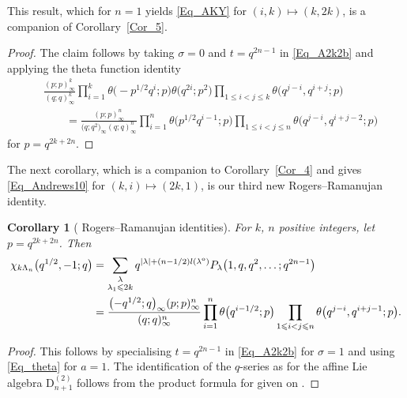 \documentclass[pdftex]{sigma}
\numberwithin{equation}{section}
\newtheorem{Corollary}[Theorem]{Corollary}
\renewcommand{\leq}{\leqslant}
\newcommand{\abs}[1]{\vert#1\vert}
\newcommand{\la}{\lambda}
\newcommand{\La}{\Lambda}
\begin{document}
This result, which for $n=1$ yields \eqref{Eq_AKY} for
$(i,k)\mapsto(k,2k)$, is a companion of Corollary~\ref{Cor_5}.

\begin{proof}
The claim follows by taking $\sigma=0$ and $t=q^{2n-1}$ in
\eqref{Eq_A2k2b} and applying the theta function identity
\begin{align*}
&\frac{(p;p)_{\infty}^k}{(q;q)_{\infty}^k}
\prod_{i=1}^k \theta\bigl({-}p^{1/2}q^i;p\bigr)
\theta\bigl(q^{2i};p^2\bigr)
\prod_{1\leq i<j\leq k}\theta\bigl(q^{j-i},q^{i+j};p\bigr) \\
&\qquad= \frac{(p;p)_{\infty}^n}{\bigl(q;q^2\bigr)_{\infty}(q;q)_{\infty}^n}
\prod_{i=1}^n \theta\bigl(p^{1/2}q^{i-1};p\bigr)
\prod_{1\leq i<j\leq n} \theta\bigl(q^{j-i},q^{i+j-2};p\bigr)
\end{align*}
for $p=q^{2k+2n}$.
\end{proof}

The next corollary, which is a companion to Corollary~\ref{Cor_4} and
gives \eqref{Eq_Andrews10} for $(k,i)\mapsto (2k,1)$, is our third new
Rogers--Ramanujan identity.

\begin{Corollary}[ Rogers--Ramanujan identities]
\label{Cor_9}
For $k$, $n$ positive integers, let $p=q^{2k+2n}$.
Then
\begin{align*}
\chi_{k\La_n}\bigl(q^{1/2},-1;q\bigr)&=
\sum_{\substack{\la \\[1pt] \la_1\leq 2k}}
q^{\abs{\la}+(n-1/2)l(\la^{\textup{o}})}
P_{\la}\bigl(1,q,q^2,\dots;q^{2n-1}\bigr) \\
&=\frac{\bigl(-q^{1/2};q\bigr)_{\infty}(p;p)_{\infty}^n}{(q;q)_{\infty}^n}
\prod_{i=1}^n \theta\bigl(q^{i-1/2};p\bigr)
\prod_{1\leq i<j\leq n} \theta\bigl(q^{j-i},q^{i+j-1};p\bigr).
\end{align*}
\end{Corollary}

\begin{proof}
This follows by specialising $t=q^{2n-1}$ in \eqref{Eq_A2k2b} for
$\sigma=1$ and using \eqref{Eq_theta} for $a=1$.
The identification of the $q$-series as
\smash{$\chi_{k\La_n}\bigl(q^{1/2},-1;q\bigr)$} for the affine Lie algebra
$\mathrm{D}_{n+1}^{(2)}$ follows from the product formula for
\smash{$\chi_{\La}\bigl(q^{1/2},-1;q\bigr)$} given on \cite[p.~75]{RW21}.
\end{proof}
\end{document}
